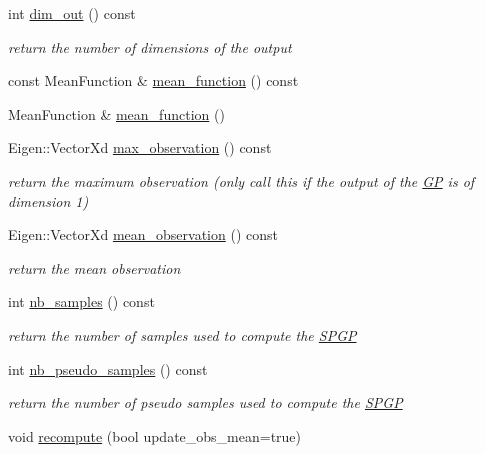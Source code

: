\begin{DoxyCompactItemize}
int \hyperlink{classlimbo_1_1model_1_1_s_p_g_p_a605b47cf6ecf50c2436cbad531099d16}{dim\+\_\+out} () const 
\begin{DoxyCompactList}\small\item\em return the number of dimensions of the output \end{DoxyCompactList}\item 
const Mean\+Function \& \hyperlink{classlimbo_1_1model_1_1_s_p_g_p_a4bb34b4001647ebbfd0e949b35c39a0c}{mean\+\_\+function} () const 
\item 
Mean\+Function \& \hyperlink{classlimbo_1_1model_1_1_s_p_g_p_afd6a1362afffaff3ed58ab17b49bd0b4}{mean\+\_\+function} ()
\item 
Eigen\+::\+Vector\+Xd \hyperlink{classlimbo_1_1model_1_1_s_p_g_p_a579bcd7df20371291633b45be1ec73b4}{max\+\_\+observation} () const 
\begin{DoxyCompactList}\small\item\em return the maximum observation (only call this if the output of the \hyperlink{classlimbo_1_1model_1_1_g_p}{GP} is of dimension 1) \end{DoxyCompactList}\item 
Eigen\+::\+Vector\+Xd \hyperlink{classlimbo_1_1model_1_1_s_p_g_p_a1d586dd8c2b9a1bce6ab3b39ba42c380}{mean\+\_\+observation} () const 
\begin{DoxyCompactList}\small\item\em return the mean observation \end{DoxyCompactList}\item 
int \hyperlink{classlimbo_1_1model_1_1_s_p_g_p_a9d3bcefa04f22fef8ad518358512154d}{nb\+\_\+samples} () const 
\begin{DoxyCompactList}\small\item\em return the number of samples used to compute the \hyperlink{classlimbo_1_1model_1_1_s_p_g_p}{S\+P\+GP} \end{DoxyCompactList}\item 
int \hyperlink{classlimbo_1_1model_1_1_s_p_g_p_a43c26bf3d36965be388aa4814cf144c5}{nb\+\_\+pseudo\+\_\+samples} () const 
\begin{DoxyCompactList}\small\item\em return the number of pseudo samples used to compute the \hyperlink{classlimbo_1_1model_1_1_s_p_g_p}{S\+P\+GP} \end{DoxyCompactList}\item 
void \hyperlink{classlimbo_1_1model_1_1_s_p_g_p_a7443e10b67b9e4934572401ef099a517}{recompute} (bool update\+\_\+obs\+\_\+mean=true)

\end{DoxyCompactItemize}
